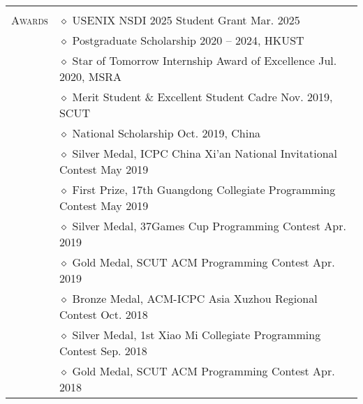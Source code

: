 \documentclass[letterpaper, 12pt]{article}
\begin{document}
\begin{longtable}{p{1.0in}p{5.8in}}
& \\


\nohyphens{\textsc{Awards}}
& $\diamond$ USENIX NSDI 2025 Student Grant \hfill Mar. 2025 \\

& $\diamond$ Postgraduate Scholarship \hfill 2020 -- 2024, HKUST \\
& $\diamond$ Star of Tomorrow Internship Award of Excellence \hfill Jul. 2020, MSRA \\

& $\diamond$ Merit Student \& Excellent Student Cadre \hfill Nov. 2019, SCUT \\
& $\diamond$ National Scholarship \hfill Oct. 2019, China \\

& $\diamond$ Silver Medal, ICPC China Xi'an National Invitational Contest \hfill May 2019 \\

& $\diamond$ First Prize, 17th Guangdong Collegiate Programming Contest \hfill May 2019 \\

& $\diamond$ Silver Medal, 37Games Cup Programming Contest \hfill Apr. 2019 \\

& $\diamond$ Gold Medal, SCUT ACM Programming Contest \hfill Apr. 2019 \\

& $\diamond$ Bronze Medal, ACM-ICPC Asia Xuzhou Regional Contest \hfill Oct. 2018 \\

& $\diamond$ Silver Medal, 1st Xiao Mi Collegiate Programming Contest \hfill Sep. 2018 \\

& $\diamond$ Gold Medal, SCUT ACM Programming Contest \hfill Apr. 2018 \\


\end{longtable}
\end{document}

